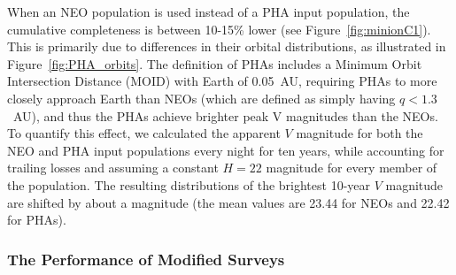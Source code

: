 When an NEO population is used instead of a PHA input population, the cumulative completeness is between 10-15\% lower 
(see Figure~\ref{fig:minionC1}). This is primarily due to differences in their orbital distributions, as illustrated in Figure~\ref{fig:PHA_orbits}. The definition of PHAs includes a Minimum Orbit Intersection Distance (MOID) with Earth of 0.05~AU, requiring PHAs to more closely approach Earth than NEOs (which are defined as simply having $q<1.3$~AU), and thus the PHAs achieve brighter peak V magnitudes than the NEOs. To quantify this effect, we calculated the apparent $V$ magnitude for both the NEO and PHA input populations every night for ten years, while accounting for trailing losses and assuming a constant $H=22$ magnitude for every member of the population. The resulting distributions of the 
brightest 10-year $V$ magnitude are shifted by about a magnitude (the mean values are 23.44 for NEOs and 22.42 for PHAs). 


\subsubsection{The Performance of Modified Surveys} 

